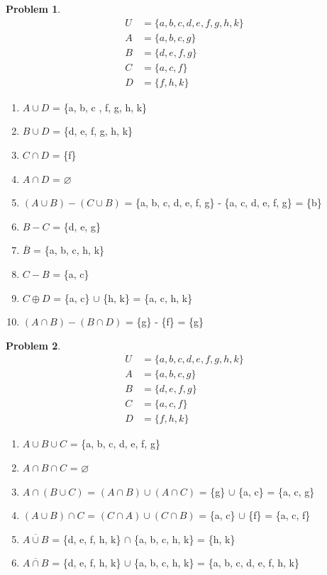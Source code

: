 \documentclass{article}
\theoremstyle{definition}
\newtheorem{problem}{Problem}[section]
\begin{document}
\begin{problem}
\[
    \begin{aligned}
        U &= \{a, b, c, d, e, f, g, h, k\}\\
        A &= \{a, b, c, g\}\\
        B &= \{d, e, f, g\}\\
        C &= \{a, c, f\}\\
        D &= \{f, h, k\}
    \end{aligned}
\]
    \begin{enumerate}[label=(\alph*)]
        Compute

        \item \(A \cup D\) = \{a, b, c , f, g, h, k\}
        \item \(B \cup D\) = \{d, e, f, g, h, k\}
        \item \(C \cap D\) = \{f\}
        \item \(A \cap D\) = $\varnothing$
        \item \((A \cup B) - (C \cup B)\) = \{a, b, c, d, e, f, g\} - \{a, c, d, e, f, g\} = \{b\}
        \item \(B - C\) = \{d, e, g\}
        \item \(\overline{B}\) = \{a, b, c, h, k\}
        \item \(C - B\) = \{a, c\}
        \item \(C \oplus D\) = \{a, c\} $\cup$ \{h, k\} = \{a, c, h, k\}
        \item \((A \cap B) - (B \cap D)\) = \{g\} - \{f\} = \{g\}
    \end{enumerate}
\end{problem}


\begin{problem}
\[
    \begin{aligned}
        U &= \{a, b, c, d, e, f, g, h, k\}\\
        A &= \{a, b, c, g\}\\
        B &= \{d, e, f, g\}\\
        C &= \{a, c, f\}\\
        D &= \{f, h, k\}
    \end{aligned}
\]
    \begin{enumerate}[label=(\alph*)]
        Compute

        \item \(A \cup B \cup C\) = \{a, b, c, d, e, f, g\}
        \item \(A \cap B \cap C\) = $\varnothing$
        \item \(A \cap (B \cup C)\) = $(A \cap B) \cup (A \cap C)$ = \{g\} $\cup$ \{a, c\} = \{a, c, g\}
        \item \((A \cup B) \cap C\) = $(C \cap A) \cup (C \cap B)$ = \{a, c\} $\cup$ \{f\} = \{a, c, f\}
        \item \(\overline{A \cup B}\) = \{d, e, f, h, k\} $\cap$ \{a, b, c, h, k\} = \{h, k\}
        \item \(\overline{A \cap B}\) = \{d, e, f, h, k\} $\cup$ \{a, b, c, h, k\} = \{a, b, c, d, e, f, h, k\}
    \end{enumerate}
\end{problem}
\end{document}
